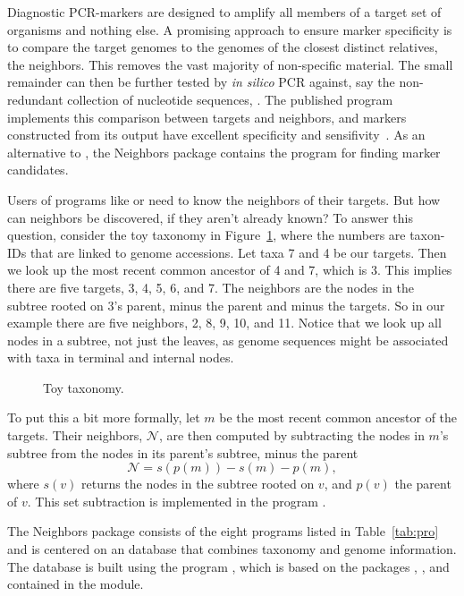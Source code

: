 Diagnostic PCR-markers are designed to amplify all members of a target
set of organisms and nothing else. A promising approach to ensure
marker specificity is to compare the target genomes to the genomes of
the closest distinct relatives, the neighbors. This removes the vast
majority of non-specific material. The small remainder can then be
further tested by \emph{in silico} PCR against, say the non-redundant
collection of nucleotide sequences, . The published
program  implements this comparison between targets and
neighbors, and markers constructed from its output have excellent
specificity and sensifivity~\cite{hau21:fur}. As an alternative
to , the Neighbors package contains the program 
for finding marker candidates.

Users of programs like  or  need to know the
neighbors of their targets. But how can neighbors be discovered, if
they aren't already known? To answer this question, consider the toy
taxonomy in Figure~\ref{fig:tax}, where the numbers are taxon-IDs that
are linked to genome accessions. Let taxa 7 and 4 be our targets. Then
we look up the most recent common ancestor of 4 and 7, which is
3. This implies there are five targets, 3, 4, 5, 6, and 7. The
neighbors are the nodes in the subtree rooted on 3's parent, minus the
parent and minus the targets. So in our example there are five
neighbors, 2, 8, 9, 10, and 11. Notice that we look up all nodes in a
subtree, not just the leaves, as genome sequences might be associated
with taxa in terminal and internal nodes.

\begin{figure}
\begin{center}

\end{center}
\caption{Toy taxonomy.}\label{fig:tax}
\end{figure}

To put this a bit more formally, let $m$ be the most recent common
ancestor of the targets. Their neighbors, $\mathcal{N}$, are then
computed by subtracting the nodes in $m$'s subtree from the nodes in
its parent's subtree, minus the parent
\begin{equation}\label{eq:nei}
\mathcal{N} = s(p(m)) - s(m) - p(m),
\end{equation}
where $s(v)$ returns the nodes in the subtree rooted on $v$, and
$p(v)$ the parent of $v$. This set subtraction is implemented in the
program .

The Neighbors package consists of the eight programs listed in
Table~\ref{tab:pro} and is centered on an  database that
combines taxonomy and genome information. The database is built using
the program , which is based on the
packages , , and  contained in the
 module.

